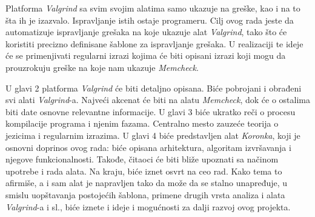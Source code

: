 \documentclass[12pt,oneside]{memoir}
\theoremstyle{plain}
\theoremstyle{definition}
\begin{document}
Platforma \textit{Valgrind} sa svim svojim alatima samo ukazuje na greške, kao i na to šta ih je izazvalo. Ispravljanje istih ostaje programeru. Cilj ovog rada jeste da automatizuje ispravljanje grešaka na koje ukazuje alat \textit{Valgrind}, tako što će koristiti precizno definisane šablone za ispravljanje grešaka. U realizaciji te ideje će se primenjivati regularni izrazi kojima će biti opisani izrazi koji mogu da prouzrokuju greške na koje nam ukazuje \textit{Memcheck}.

U glavi 2 platforma \textit{Valgrind} će biti detaljno opisana. Biće pobrojani i obrađeni svi alati \textit{Valgrind}-a. Najveći akcenat će biti na alatu \textit{Memcheck}, dok će o ostalima biti date osnovne relevantne informacije. U glavi 3 biće ukratko reči o procesu kompilacije programa i njenim fazama. Centralno mesto zauzeće teorija o jezicima i regularnim izrazima. U glavi 4 biće predstavljen alat \textit{Koronka}, koji je osnovni doprinos ovog rada: biće opisana arhitektura, algoritam izvršavanja i njegove funkcionalnosti. Takođe, čitaoci će biti bliže upoznati sa načinom upotrebe i rada alata. Na kraju, biće iznet osvrt na ceo rad. Kako tema to afirmiše, a i sam alat je napravljen tako da može da se stalno unapređuje, u smislu uopštavanja postojećih šablona, primene drugih vrsta analiza i alata \textit{Valgrind}-a i sl., biće iznete i ideje i mogućnosti za dalji razvoj ovog projekta.
\end{document}
